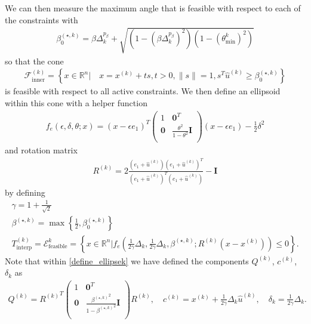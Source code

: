 \documentclass{article}
\theoremstyle{case}
\numberwithin{theorem}{subsection}
\newcommand{\bs}{{\beta^{(\star, k)}}}
\newcommand{\bsk}{{\beta_0^{(\star, k)}}}
\newcommand{\ck}{{c^{(k)}}}
\newcommand{\dk}{\Delta_k}
\newcommand{\fcki}{{\mathcal {F}^{(k)}_{\textrm{inner}}}}
\newcommand{\huk}{{{\hat u}^{(k)}}}
\newcommand{\qk}{{Q^{(k)}}}
\newcommand{\Rn}{\mathbb R^n}
\newcommand{\rotk}{{R^{(k)}}}
\newcommand{\sampletrk}{{T_{\text{interp}}^{(k)}}}
\newcommand{\sdk}{{\delta_k}}
\newcommand{\thetamink}{{\theta^k_{\textrm{min}}}}
\newcommand{\unshiftedellipsoid}{{\mathcal E^k_{\textrm{feasible}}}}
\newcommand{\xk}{{x^{(k)}}}
\begin{document}
We can then measure the maximum angle that is feasible with respect to each of the constraints with
\begin{align}
\bsk = \beta\dk^{p_{\beta}} + \sqrt{\left(1 - \left(\beta\dk^{p_{\beta}}\right)^2\right)\left(1 - \left(\thetamink\right) ^2\right)} \label{define_bsk}
\end{align}
so that the cone
\begin{align}
\fcki = \left\{x \in \Rn \bigg| \quad x = \xk + ts, t > 0, \|s\| = 1, s^T\huk \ge \bsk \right\} \label{define_inner_cone}
\end{align}
is feasible with respect to all active constraints.
We then define an ellipsoid within this cone with a helper function
\begin{align}
f_e(\epsilon, \delta, \theta; x) = (x - \epsilon e_1)^T\begin{pmatrix}
1 & \boldsymbol0^T \\
\boldsymbol 0 & \frac{\theta^2}{1 - \theta^2} \boldsymbol I \\
\end{pmatrix}(x - \epsilon e_1) - \frac 1 2 \delta^2 \label{define_ellipse_function}
\end{align}
and rotation matrix
\begin{align}
\rotk = 2\frac{(e_1 + \huk)(e_1 + \huk)^T}{(e_1 + \huk)^T(e_1 + \huk)} - \boldsymbol I \label{define_rotation}
\end{align}
by defining
\begin{align}
\gamma = 1 + \frac 1 {\sqrt{2}} \label{define_the_constant_gamma} \\
\bs = \max\left\{\frac 1 2 , \bsk\right\} \label{accuracy_small_delta} \\
\sampletrk = \unshiftedellipsoid = \left\{x \in \Rn | f_e\left(\frac 1 {2\gamma} \dk, \frac 1 {2\gamma} \dk,\bs; \rotk(x - \xk)\right) \le 0\right\}. \label{define_ellipsek}
\end{align}
Note that within \cref{define_ellipsek} we have defined the components $\qk$, $\ck$, $\sdk$ as
\begin{align*}
\qk = \rotk^T \begin{pmatrix}
1 & \boldsymbol0^T \\
\boldsymbol 0 & \frac{\bs^2}{1 - \bs^2} \boldsymbol I \\
\end{pmatrix} \rotk, \quad
\ck = \xk  + \frac 1 {2\gamma} \dk\huk, \quad
\sdk = \frac 1 {2\gamma} \dk.
\end{align*}
\end{document}
